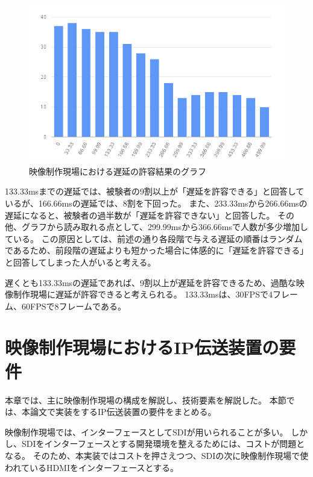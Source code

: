 \begin{figure}[htbp]
  \begin{center}
    \includegraphics[bb=0 0 600 371,width=13cm]{img/mv-delay-result-graph.png}
  \end{center}
  \caption{映像制作現場における遅延の許容結果のグラフ}
  \label{fig:mv-delay-result-graph}
\end{figure}

133.33msまでの遅延では、被験者の9割以上が「遅延を許容できる」と回答しているが、166.66msの遅延では、8割を下回った。
また、233.33msから266.66msの遅延になると、被験者の過半数が「遅延を許容できない」と回答した。
その他、グラフから読み取れる点として、299.99msから366.66msで人数が多少増加している。
この原因としては、前述の通り各段階で与える遅延の順番はランダムであるため、前段階の遅延よりも短かった場合に体感的に「遅延を許容できる」と回答してしまった人がいると考える。

遅くとも133.33msの遅延であれば、9割以上が遅延を許容できるため、過酷な映像制作現場に遅延が許容できると考えられる。
133.33msは、30FPSで4フレーム、60FPSで8フレームである。

\section{映像制作現場におけるIP伝送装置の要件}
本章では、主に映像制作現場の構成を解説し、技術要素を解説した。
本節では、本論文で実装をするIP伝送装置の要件をまとめる。

映像制作現場では、インターフェースとしてSDIが用いられることが多い。
しかし、SDIをインターフェースとする開発環境を整えるためには、コストが問題となる。
そのため、本実装ではコストを押さえつつ、SDIの次に映像制作現場で使われているHDMIをインターフェースとする。

